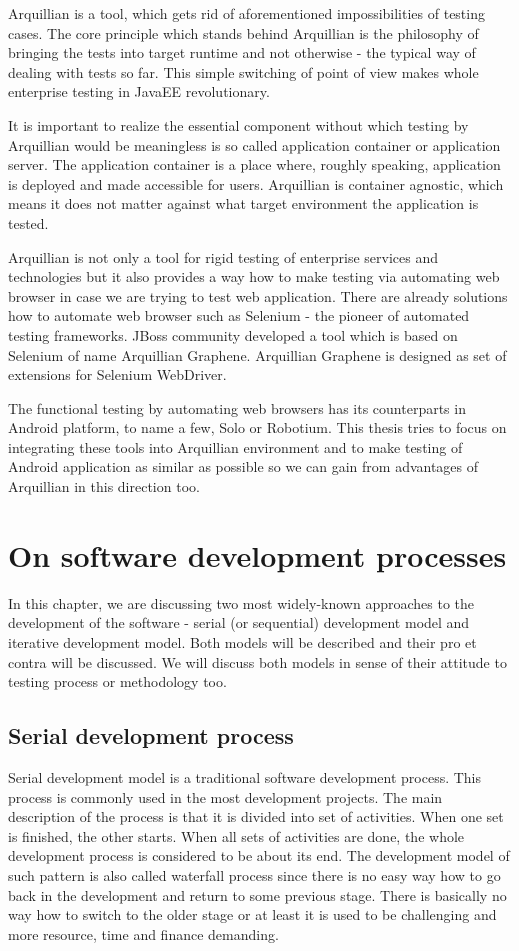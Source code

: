 \documentclass[12pt,final,oneside]{fithesis}
\begin{document}
Arquillian is a tool, which gets rid of aforementioned impossibilities of testing cases. The core principle which stands behind Arquillian is the philosophy of bringing the tests into target runtime and not otherwise - the typical way of dealing with tests so far. This simple switching of point of view makes whole enterprise testing in JavaEE revolutionary. 

It is important to realize the essential component without which testing by Arquillian would be meaningless is so called application container or application server. The application container is a place where, roughly speaking, application is deployed and made accessible for users. Arquillian is container agnostic, which means it does not matter against what target environment the application is tested.

Arquillian is not only a tool for rigid testing of enterprise services and technologies but it also provides a way how to make testing via automating web browser in case we are trying to test web application. There are already solutions how to automate web browser such as Selenium - the pioneer of automated testing frameworks. JBoss community developed a tool which is based on Selenium of name Arquillian Graphene. Arquillian Graphene is designed as set of extensions for Selenium WebDriver.

The functional testing by automating web browsers has its counterparts in Android platform, to name a few, Solo or Robotium. This thesis tries to focus on integrating these tools into Arquillian environment and to make testing of Android application as similar as possible so we can gain from advantages of Arquillian in this direction too. 

\chapter{On software development processes}

In this chapter, we are discussing two most widely-known approaches to the development of the software - serial (or sequential) development model and iterative development model. Both models will be described and their pro et contra will be discussed. We will discuss both models in sense of their attitude to testing process or methodology too.

	\section{Serial development process}
Serial development model is a traditional software development process. This process is commonly used in the most development projects. The main description of the process is that it is divided into set of activities. When one set is finished, the other starts. When all sets of activities are done, the whole development process is considered to be about its end. The development model of such pattern is also called waterfall process since there is no easy way how to go back in the development and return to some previous stage. There is basically no way how to switch to the older stage or at least it is used to be challenging and more resource, time and finance demanding.
\end{document}
